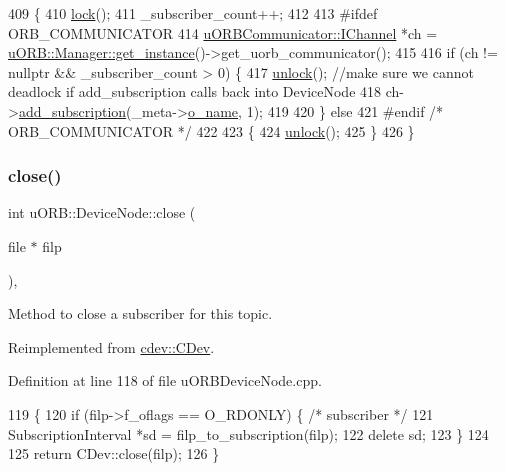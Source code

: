 \begin{DoxyCode}
409 \{
410     \hyperlink{classcdev_1_1CDev_ae676cccee31dd393ab681414a146d868}{lock}();
411     \_subscriber\_count++;
412 
413 \textcolor{preprocessor}{#ifdef ORB\_COMMUNICATOR}
414     \hyperlink{classuORBCommunicator_1_1IChannel}{uORBCommunicator::IChannel} *ch = 
      \hyperlink{classuORB_1_1Manager_a9d829b3ea49d16d03c2fa37ef2bb24a5}{uORB::Manager::get\_instance}()->get\_uorb\_communicator();
415 
416     \textcolor{keywordflow}{if} (ch != \textcolor{keyword}{nullptr} && \_subscriber\_count > 0) \{
417         \hyperlink{classcdev_1_1CDev_af65273e0578b277deea057dc7d558e9d}{unlock}(); \textcolor{comment}{//make sure we cannot deadlock if add\_subscription calls back into DeviceNode}
418         ch->\hyperlink{classuORBCommunicator_1_1IChannel_a2fdcab300f1c9ccf8c43858493ca9358}{add\_subscription}(\_meta->\hyperlink{structorb__metadata_a54d1751f24aa0c1f24934c6712811e58}{o\_name}, 1);
419 
420     \} \textcolor{keywordflow}{else}
421 \textcolor{preprocessor}{#endif }\textcolor{comment}{/* ORB\_COMMUNICATOR */}\textcolor{preprocessor}{}
422 
423     \{
424         \hyperlink{classcdev_1_1CDev_af65273e0578b277deea057dc7d558e9d}{unlock}();
425     \}
426 \}
\end{DoxyCode}
\mbox{\label{classuORB_1_1DeviceNode_a80ebf695636c701d3378525b6d0e4148}} 
\subsubsection{\texorpdfstring{close()}{close()}}
{\footnotesize\ttfamily int u\+O\+R\+B\+::\+Device\+Node\+::close (\begin{DoxyParamCaption}\item[{file $\ast$}]{filp }\end{DoxyParamCaption})\hspace{0.3cm}{\ttfamily [override]}, {\ttfamily [virtual]}}

Method to close a subscriber for this topic. 

Reimplemented from \hyperlink{classcdev_1_1CDev_a9241755ab3abf102eea85dad1e3dc6c4}{cdev\+::\+C\+Dev}.



Definition at line 118 of file u\+O\+R\+B\+Device\+Node.\+cpp.


\begin{DoxyCode}
119 \{
120     \textcolor{keywordflow}{if} (filp->f\_oflags == O\_RDONLY) \{ \textcolor{comment}{/* subscriber */}
121         SubscriptionInterval *sd = filp\_to\_subscription(filp);
122         \textcolor{keyword}{delete} sd;
123     \}
124 
125     \textcolor{keywordflow}{return} CDev::close(filp);
126 \}
\end{DoxyCode}
\mbox{\label{classuORB_1_1DeviceNode_a89d9a792e1e38e04c65baba20f29d780}} 
